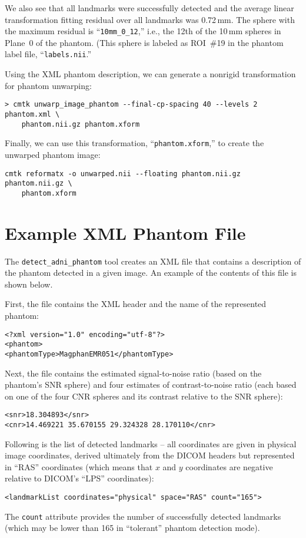 \documentclass{InsightArticle}
\begin{document}
We also see that all landmarks were successfully detected and the average
linear transformation fitting residual over all landmarks was 0.72\,mm. The
sphere with the maximum residual is ``\texttt{10mm\_0\_12},'' i.e., the 12th
of the 10\,mm spheres in Plane~0 of the phantom. (This sphere is labeled as
ROI~\#19 in the phantom label file, ``\texttt{labels.nii}.''

Using the XML phantom description, we can generate a nonrigid transformation
for phantom unwarping:
\begin{verbatim}
> cmtk unwarp_image_phantom --final-cp-spacing 40 --levels 2 phantom.xml \
    phantom.nii.gz phantom.xform
\end{verbatim}
Finally, we can use this transformation, ``\texttt{phantom.xform},'' to create
the unwarped phantom image:
\begin{verbatim}
cmtk reformatx -o unwarped.nii --floating phantom.nii.gz phantom.nii.gz \
    phantom.xform
\end{verbatim}

\section{Example XML Phantom File}
\label{sec:ExampleXML}

The \texttt{detect\_adni\_phantom} tool creates an XML file that contains a
description of the phantom detected in a given image. An example of the
contents of this file is shown below.

First, the file contains the XML header and the name of the represented
phantom:
\begin{verbatim}
<?xml version="1.0" encoding="utf-8"?>
<phantom>
<phantomType>MagphanEMR051</phantomType>
\end{verbatim}
Next, the file contains the estimated signal-to-noise ratio (based on the
phantom's SNR sphere) and four estimates of contrast-to-noise ratio (each
based on one of the four CNR spheres and its contrast relative to the SNR
sphere):
\begin{verbatim}
<snr>18.304893</snr>
<cnr>14.469221 35.670155 29.324328 28.170110</cnr>
\end{verbatim}
Following is the list of detected landmarks -- all coordinates are given in
physical image coordinates, derived ultimately from the DICOM headers but
represented in ``RAS'' coordinates (which means that $x$ and $y$ coordinates
are negative relative to DICOM's ``LPS'' coordinates):
\begin{verbatim}
<landmarkList coordinates="physical" space="RAS" count="165">
\end{verbatim} 
The \verb|count| attribute provides the number of successfully detected
landmarks (which may be lower than 165 in ``tolerant'' phantom detection
mode).
\end{document}
